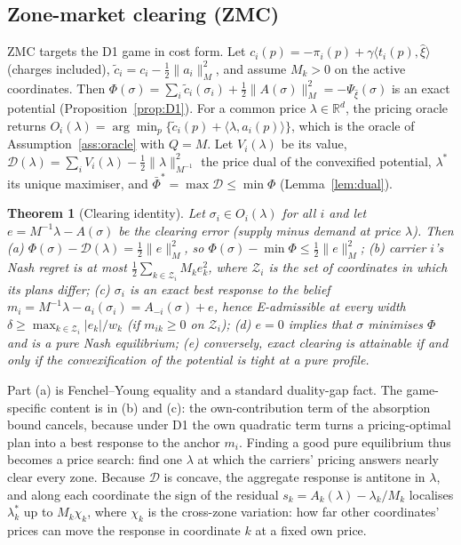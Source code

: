 \documentclass[preprint,12pt]{elsarticle}
\newtheorem{theorem}{Theorem}
\theoremstyle{definition}
\theoremstyle{remark}
\newcommand{\R}{\mathbb{R}}
\newcommand{\ip}[2]{\langle #1,#2\rangle}
\begin{document}
\subsection{Zone-market clearing (ZMC)}\label{sec:zmc}

ZMC targets the D1 game in cost form. Let $c_i(p)=-\pi_i(p)+\gamma\ip{t_i(p)}{\hat\xi}$ (charges included), $\tilde c_i=c_i-\tfrac12\|a_i\|_M^2$, and assume $M_k>0$ on the active coordinates. Then $\Phi(\sigma)=\sum_i\tilde c_i(\sigma_i)+\tfrac12\|A(\sigma)\|_M^2=-\Psi_{\hat\xi}(\sigma)$ is an exact potential (Proposition~\ref{prop:D1}). For a common price $\lambda\in\R^d$, the pricing oracle returns $O_i(\lambda)=\arg\min_p\{\tilde c_i(p)+\ip{\lambda}{a_i(p)}\}$, which is the oracle of Assumption~\ref{ass:oracle} with $Q=M$. Let $V_i(\lambda)$ be its value, $\mathcal D(\lambda)=\sum_iV_i(\lambda)-\tfrac12\|\lambda\|^2_{M^{-1}}$ the price dual of the convexified potential, $\lambda^*$ its unique maximiser, and $\bar\Phi^*=\max\mathcal D\le\min\Phi$ (Lemma~\ref{lem:dual}).

\begin{theorem}[Clearing identity]\label{thm:clear}
Let $\sigma_i\in O_i(\lambda)$ for all $i$ and let $e=M^{-1}\lambda-A(\sigma)$ be the clearing error (supply minus demand at price $\lambda$). Then
(a) $\Phi(\sigma)-\mathcal D(\lambda)=\tfrac12\|e\|_M^2$, so $\Phi(\sigma)-\min\Phi\le\tfrac12\|e\|_M^2$;
(b) carrier $i$'s Nash regret is at most $\tfrac12\sum_{k\in\mathcal Z_i}M_ke_k^2$, where $\mathcal Z_i$ is the set of coordinates in which its plans differ;
(c) $\sigma_i$ is an exact best response to the belief $m_i=M^{-1}\lambda-a_i(\sigma_i)=A_{-i}(\sigma)+e$, hence E-admissible at every width $\delta\ge\max_{k\in\mathcal Z_i}|e_k|/w_k$ (if $m_{ik}\ge0$ on $\mathcal Z_i$);
(d) $e=0$ implies that $\sigma$ minimises $\Phi$ and is a pure Nash equilibrium;
(e) conversely, exact clearing is attainable if and only if the convexification of the potential is tight at a pure profile.
\end{theorem}

Part (a) is Fenchel--Young equality and a standard duality-gap fact. The game-specific content is in (b) and (c): the own-contribution term of the absorption bound cancels, because under D1 the own quadratic term turns a pricing-optimal plan into a best response to the anchor $m_i$. Finding a good pure equilibrium thus becomes a price search: find one $\lambda$ at which the carriers' pricing answers nearly clear every zone. Because $\mathcal D$ is concave, the aggregate response is antitone in $\lambda$, and along each coordinate the sign of the residual $s_k=A_k(\lambda)-\lambda_k/M_k$ localises $\lambda^*_k$ up to $M_k\chi_k$, where $\chi_k$ is the cross-zone variation: how far other coordinates' prices can move the response in coordinate $k$ at a fixed own price.
\end{document}
